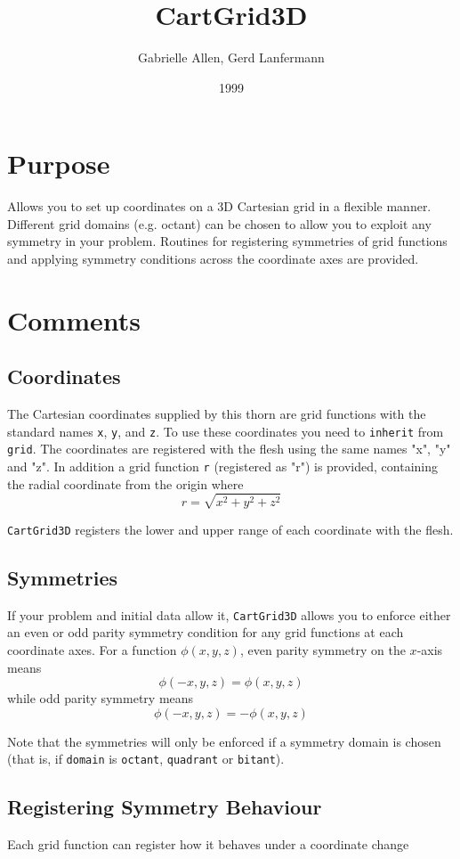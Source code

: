 \documentclass{article}
\begin{document}
\title{CartGrid3D}
\author{Gabrielle Allen, Gerd Lanfermann}
\date{1999}
\maketitle


\section{Purpose}

Allows you to set up coordinates on a 3D Cartesian grid in a 
flexible manner. Different grid domains (e.g. octant) can 
be chosen to allow you to exploit any symmetry in your 
problem. Routines for registering symmetries of grid functions
and applying symmetry conditions across the coordinate axes 
are provided.

\section{Comments}

\subsection{Coordinates}

The Cartesian coordinates supplied by this thorn are
grid functions with the standard names {\tt x}, {\tt y}, and
{\tt z}. To use these coordinates you need to {\tt inherit}
from {\tt grid}.  The coordinates are
registered with the flesh using the same names "x", "y" 
and "z". In addition a grid function {\tt r} (registered as
"r") is provided, containing the radial coordinate from
the origin where
$$
r = \sqrt{x^2+y^2+z^2}
$$

{\tt CartGrid3D} registers the lower and upper range of each coordinate
with the flesh.

\subsection{Symmetries}

If your problem and initial data allow it, {\tt CartGrid3D}
allows you to enforce either an even or odd parity
symmetry condition for any grid functions at each
coordinate axes. For a function $\phi(x,y,z)$,
even parity symmetry on the $x$-axis means
$$
\phi(-x,y,z) = \phi(x,y,z)
$$
while odd parity symmetry means
$$
\phi(-x,y,z) = -\phi(x,y,z)
$$

Note that the symmetries will only be enforced if a 
symmetry domain is chosen (that is, if 
{\tt domain} is {\tt octant}, {\tt quadrant} or {\tt bitant}).

\subsection{Registering Symmetry Behaviour}

Each grid function can register how it behaves under a coordinate change





\end{document}
